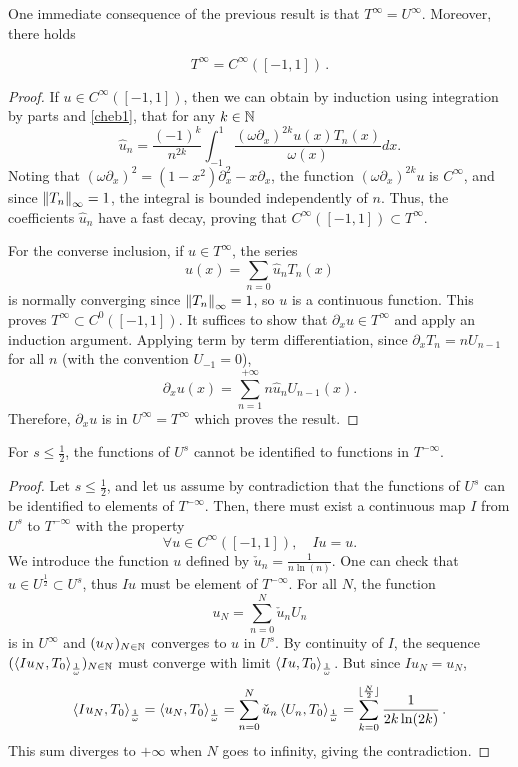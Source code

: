 \documentclass[a4paper]{article}
\begin{document}
\noindent 
One immediate consequence of the previous result is that $T^{\infty} = U^{\infty}$. Moreover, there holds
\begin{Lem}
	\[T^{\infty} = C^{\infty}([-1,1])\,.\]
	\label{LemTinfCinf}
\end{Lem}
\begin{proof}
	If $u \in C^{\infty}([-1,1])$, then we can obtain by induction using integration by parts and \eqref{cheb1}, that for any $k \in \mathbb{N}$
	\[\hat{u}_n = \frac{(-1)^k}{n^{2k}} \int_{-1}^{1} \dfrac{(\omega\partial_x)^{2k} u(x) T_n(x)}{\omega(x)}dx.\]
	Noting that $(\omega \partial_x)^2 = (1-x^2)\partial_x^2 - x \partial_ x$, the function $(\omega \partial_x)^{2k}u$ is $C^{\infty}$, and since $\left\|T_n\right\|_\infty = 1$, the integral is bounded independently of $n$. Thus, the coefficients $\hat{u}_n$ have a fast decay, proving that $C^{\infty}([-1,1]) \subset T^{\infty}$. 
	
	For the converse inclusion, if $u \in T^{\infty}$, the series
	\[ u(x) = \sum_{n=0} \hat{u}_n T_n(x)\]
	is normally converging since $\left\|T_n\right\|_\infty = 1$, so $u$ is a continuous function. This proves $T^{\infty} \subset C^0([-1,1])$. It suffices to show that $\partial_x u \in T^{\infty}$ and apply an induction argument. Applying term by term differentiation, since $\partial_x T_n = n U_{n-1}$ for all $n$ (with the convention $U_{-1} = 0$),
	\[\partial_x u(x) = \sum_{n=1}^{+\infty} n \hat{u}_n U_{n-1}(x).\] 
	Therefore, $\partial_x u$ is in $U^{\infty} = T^{\infty}$ which proves the result.
\end{proof}
\begin{Lem}
	For $s \leq \frac{1}{2}$, the functions of $U^s$ cannot be identified to functions in $T^{-\infty}$. 	
\end{Lem}
\begin{proof}
	Let $s \leq \frac{1}{2}$, and let us assume by contradiction that the functions of $U^{s}$ can be identified to elements of $T^{-\infty}$. Then, there must exist a continuous map $I$ from $U^{s}$ to $T^{-\infty}$ with the property 
	\[\forall u \in C^{\infty}([-1,1]), \quad Iu = u.\]
	We introduce the function $u$ defined by $\check{u}_n = \frac{1}{n \ln(n)}$. One can check that $u \in U^{\frac{1}{2}} \subset U^s$, thus $Iu$ must be element of $T^{-\infty}$. For all $N$, the function 
	\[u_N = \sum_{n = 0}^{N} \check{u}_n U_n\]
	is in $U^{\infty}$ and $(u_N)_{N \in \mathbb{N}}$ converges to $u$ in $U^{s}$. By continuity of $I$, the sequence $(\left\langle I u_N,T_0\right\rangle_\frac{1}{\omega})_{N\in \mathbb{N}}$ must converge with limit $\left\langle Iu,T_0\right\rangle_\frac{1}{\omega}$. But since $Iu_N = u_N$, 
	\[\left\langle Iu_N,T_0\right\rangle_\frac{1}{\omega} = \left\langle u_N,T_0\right\rangle_\frac{1}{\omega} = \sum_{n=0}^{N} \check{u}_n\left\langle U_n,T_0\right\rangle_\frac{1}{\omega} = \sum_{k = 0}^{\lfloor \frac{N}{2} \rfloor} \frac{1}{2k \ln(2k)}\,. \]
	This sum diverges to $+\infty$ when $N$ goes to infinity, giving the contradiction.
\end{proof}
\end{document}
